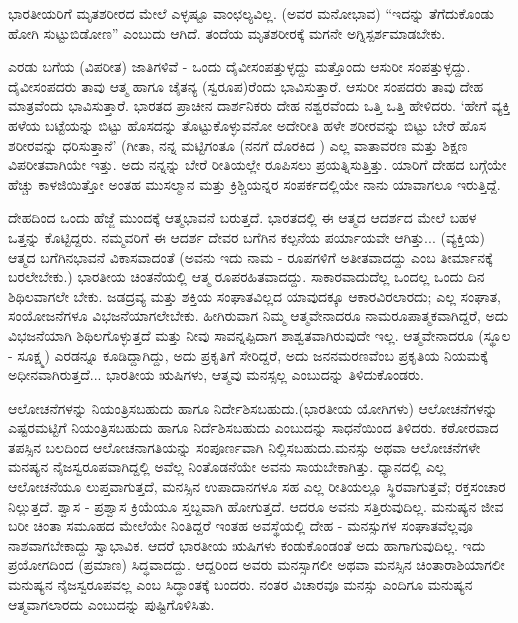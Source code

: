 ಭಾರತೀಯರಿಗೆ ಮೃತಶರೀರದ ಮೇಲೆ ಎಳ್ಳಷ್ಟೂ ವಾಂಛಲ್ಯವಿಲ್ಲ. (ಅವರ ಮನೋಭಾವ) “ಇದನ್ನು ತೆಗೆದುಕೊಂಡು ಹೋಗಿ ಸುಟ್ಟುಬಿಡೋಣ'' ಎಂಬುದು ಆಗಿದೆ. ತಂದೆಯ ಮೃತಶರೀರಕ್ಕೆ ಮಗನೇ ಅಗ್ನಿಸ್ಪರ್ಶಮಾಡಬೇಕು.

ಎರಡು ಬಗೆಯ (ವಿಪರೀತ) ಜಾತಿಗಳಿವೆ - ಒಂದು ದೈವೀಸಂಪತ್ತುಳ್ಳದ್ದು ಮತ್ತೊಂದು ಆಸುರೀ ಸಂಪತ್ತುಳ್ಳದ್ದು. ದೈವೀಸಂಪದರು ತಾವು ಆತ್ಮ ಹಾಗೂ ಚೈತನ್ಯ (ಸ್ವರೂಪ)ರೆಂದು ಭಾವಿಸುತ್ತಾರೆ. ಆಸುರೀ ಸಂಪದರು ತಾವು ದೇಹ ಮಾತ್ರವೆಂದು ಭಾವಿಸುತ್ತಾರೆ. ಭಾರತದ ಪ್ರಾಚೀನ ದಾರ್ಶನಿಕರು ದೇಹ ನಶ್ವರವೆಂದು ಒತ್ತಿ ಒತ್ತಿ ಹೇಳಿದರು. `ಹೇಗೆ ವ್ಯಕ್ತಿ ಹಳೆಯ ಬಟ್ಟೆಯನ್ನು ಬಿಟ್ಟು ಹೊಸದನ್ನು ತೊಟ್ಟುಕೊಳ್ಳುವನೋ ಅದೇರೀತಿ ಹಳೇ ಶರೀರವನ್ನು ಬಿಟ್ಟು ಬೇರೆ ಹೊಸ ಶರೀರವನ್ನು ಧರಿಸುತ್ತಾನೆ' (ಗೀತಾ,  ನನ್ನ ಮಟ್ಟಿಗಂತೂ (ನನಗೆ ದೊರಕಿದ ) ಎಲ್ಲ ವಾತಾವರಣ ಮತ್ತು ಶಿಕ್ಷಣ ವಿಪರೀತವಾಗಿಯೇ ಇತ್ತು. ಅದು ನನ್ನನ್ನು ಬೇರೆ ರೀತಿಯಲ್ಲೇ ರೂಪಿಸಲು ಪ್ರಯತ್ನಿಸುತ್ತಿತ್ತು. ಯಾರಿಗೆ ದೇಹದ ಬಗ್ಗೆಯೇ ಹೆಚ್ಚು ಕಾಳಜಿಯಿತ್ತೋ ಅಂತಹ ಮುಸಲ್ಮಾನ ಮತ್ತು ಕ್ರಿಶ್ಚಿಯನ್ನರ ಸಂಪರ್ಕದಲ್ಲಿಯೇ ನಾನು ಯಾವಾಗಲೂ ಇರುತ್ತಿದ್ದೆ.

ದೇಹದಿಂದ ಒಂದು ಹೆಜ್ಜೆ ಮುಂದಕ್ಕೆ ಆತ್ಮಭಾವನೆ ಬರುತ್ತದೆ. ಭಾರತದಲ್ಲಿ ಈ ಆತ್ಮದ ಆದರ್ಶದ ಮೇಲೆ ಬಹಳ ಒತ್ತನ್ನು ಕೊಟ್ಟಿದ್ದರು. ನಮ್ಮವರಿಗೆ ಈ ಆದರ್ಶ ದೇವರ ಬಗೆಗಿನ ಕಲ್ಪನೆಯ ಪರ್ಯಾಯವೇ ಆಗಿತ್ತು... (ವ್ಯಕ್ತಿಯ) ಆತ್ಮದ ಬಗೆಗಿನ\break ಭಾವನೆ ವಿಕಾಸವಾದಂತೆ (ಅವನು ಇದು ನಾಮ - ರೂಪಗಳಿಗೆ ಅತೀತವಾದದ್ದು ಎಂಬ ತೀರ್ಮಾನಕ್ಕೆ ಬರಲೇಬೇಕು.) ಭಾರತೀಯ ಚಿಂತನೆಯಲ್ಲಿ ಆತ್ಮ ರೂಪರಹಿತವಾದದ್ದು. ಸಾಕಾರವಾದುದೆಲ್ಲ ಒಂದಲ್ಲ ಒಂದು ದಿನ ಶಿಥಿಲವಾಗಲೇ ಬೇಕು. ಜಡದ್ರವ್ಯ ಮತ್ತು ಶಕ್ತಿಯ ಸಂಘಾತವಿಲ್ಲದ ಯಾವುದಕ್ಕೂ ಆಕಾರವಿರಲಾರದು; ಎಲ್ಲ ಸಂಘಾತ, ಸಂಯೋಜನೆಗಳೂ ವಿಭಜನೆಯಾಗಲೇಬೇಕು. ಹೀಗಿರುವಾಗ ನಿಮ್ಮ ಆತ್ಮವೇನಾದರೂ ನಾಮರೂಪಾತ್ಮಕವಾಗಿದ್ದರೆ, ಅದು ವಿಭಜನೆಯಾಗಿ ಶಿಥಿಲಗೊಳ್ಳುತ್ತದೆ ಮತ್ತು ನೀವು ಸಾವನ್ನಪ್ಪಿದಾಗ ಶಾಶ್ವತವಾಗಿರುವುದೇ ಇಲ್ಲ. ಆತ್ಮವೇನಾದರೂ (ಸ್ಥೂಲ - ಸೂಕ್ಷ್ಮ) ಎರಡನ್ನೂ ಕೂಡಿದ್ದಾಗಿದ್ದು, ಅದು ಪ್ರಕೃತಿಗೆ ಸೇರಿದ್ದರೆ, ಅದು ಜನನಮರಣವೆಂಬ ಪ್ರಕೃತಿಯ ನಿಯಮಕ್ಕೆ ಅಧೀನವಾಗಿರುತ್ತದೆ... ಭಾರತೀಯ ಋಷಿಗಳು, ಆತ್ಮವು ಮನಸ್ಸಲ್ಲ ಎಂಬುದನ್ನು ತಿಳಿದುಕೊಂಡರು.

ಆಲೋಚನೆಗಳನ್ನು ನಿಯಂತ್ರಿಸಬಹುದು ಹಾಗೂ ನಿರ್ದೇಶಿಸಬಹುದು.\break (ಭಾರತೀಯ ಯೋಗಿಗಳು) ಆಲೋಚನೆಗಳನ್ನು ಎಷ್ಟರಮಟ್ಟಿಗೆ ನಿಯಂತ್ರಿಸಬಹುದು ಹಾಗೂ ನಿರ್ದೆಶಿಸಬಹುದು ಎಂಬುದನ್ನು ಸಾಧನೆಯಿಂದ ತಿಳಿದರು. ಕಠೋರವಾದ ತಪಸ್ಸಿನ ಬಲದಿಂದ ಆಲೋಚನಾಗತಿಯನ್ನು ಸಂಪೂರ್ಣವಾಗಿ ನಿಲ್ಲಿಸಬಹುದು.\break ಮನಸ್ಸು ಅಥವಾ ಆಲೋಚನೆಗಳೇ ಮನಷ್ಯನ ನೈಜಸ್ವರೂಪವಾಗಿದ್ದಲ್ಲಿ ಅವೆಲ್ಲ ನಿಂತೊಡನೆಯೇ ಅವನು ಸಾಯಬೇಕಾಗಿತ್ತು. ಧ್ಯಾನದಲ್ಲಿ ಎಲ್ಲ ಆಲೋಚನೆಯೂ ಲುಪ್ತವಾಗುತ್ತದೆ, ಮನಸ್ಸಿನ ಉಪಾದಾನಗಳೂ ಸಹ ಎಲ್ಲ ರೀತಿಯಲ್ಲೂ ಸ್ಥಿರವಾಗುತ್ತವೆ; ರಕ್ತಸಂಚಾರ ನಿಲ್ಲುತ್ತದೆ. ಶ್ವಾಸ - ಪ್ರಶ್ವಾಸ ಕ್ರಿಯೆಯೂ ಸ್ತಬ್ದವಾಗಿ ಹೋಗುತ್ತದೆ. ಆದರೂ ಅವನು ಸತ್ತಿರುವುದಿಲ್ಲ. ಮನುಷ್ಯನ ಜೀವ ಬರೀ ಚಿಂತಾ ಸಮೂಹದ ಮೇಲೆಯೇ ನಿಂತಿದ್ದರೆ ಇಂತಹ ಅವಸ್ಥೆಯಲ್ಲಿ ದೇಹ - ಮನಸ್ಸುಗಳ ಸಂಘಾತವೆಲ್ಲವೂ ನಾಶವಾಗಬೇಕಾದ್ದು ಸ್ವಾಭಾವಿಕ. ಆದರೆ ಭಾರತೀಯ ಋಷಿಗಳು ಕಂಡುಕೊಂಡಂತೆ ಅದು ಹಾಗಾಗುವುದಿಲ್ಲ. ಇದು ಪ್ರಯೋಗದಿಂದ (ಪ್ರಮಾಣ) ಸಿದ್ಧವಾದದ್ದು. ಆದ್ದರಿಂದ ಅವರು ಮನಸ್ಸಾಗಲೀ ಅಥವಾ ಮನಸ್ಸಿನ ಚಿಂತಾರಾಶಿಯಾಗಲೀ ಮನುಷ್ಯನ ನೈಜಸ್ವರೂಪವಲ್ಲ ಎಂಬ ಸಿದ್ಧಾಂತಕ್ಕೆ ಬಂದರು. ನಂತರ ವಿಚಾರವೂ ಮನಸ್ಸು ಎಂದಿಗೂ ಮನುಷ್ಯನ ಆತ್ಮವಾಗಲಾರದು ಎಂಬುದನ್ನು ಪುಷ್ಟಿಗೊಳಿಸಿತು.

